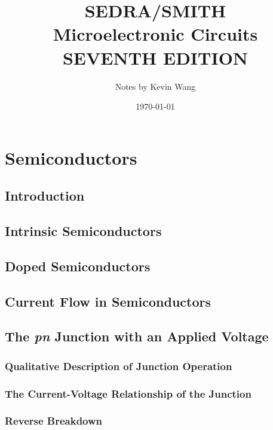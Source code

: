 \documentclass{report}
\title{\Huge{SEDRA/SMITH}\\\huge{Microelectronic Circuits}\\\normalsize{SEVENTH EDITION}}
\author{\huge{Notes by Kevin Wang}}
\date{\today}
\begin{document}
\setcounter{chapter}{2}

\maketitle
\newpage%
\tableofcontents
\pagebreak

\chapter{Semiconductors}

\section*{Introduction}
\section{Intrinsic Semiconductors}
\section{Doped Semiconductors}
\section{Current Flow in Semiconductors}
\section{The \textit{pn} Junction with an Applied Voltage}

\subsection{Qualitative Description of Junction Operation}

\subsection{The Current-Voltage Relationship of the Junction}

\subsection{Reverse Breakdown}
\end{document}
